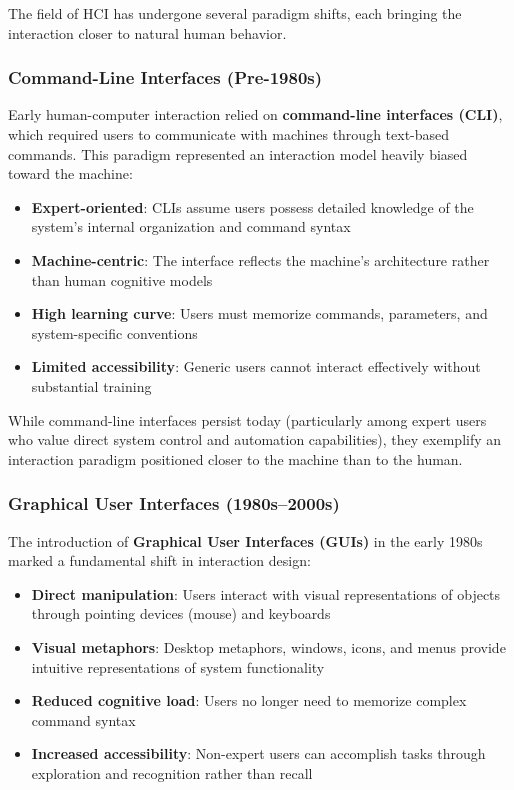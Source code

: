 \documentclass[11pt,a4paper]{article}
\theoremstyle{definition}
\theoremstyle{plain}
\theoremstyle{remark}
\begin{document}
The field of HCI has undergone several paradigm shifts, each bringing the interaction closer to natural human behavior.

\subsubsection{Command-Line Interfaces (Pre-1980s)}

Early human-computer interaction relied on \textbf{command-line interfaces (CLI)}, which required users to communicate with machines through text-based commands. This paradigm represented an interaction model heavily biased toward the machine:

\begin{itemize}
    \item \textbf{Expert-oriented}: CLIs assume users possess detailed knowledge of the system's internal organization and command syntax
    \item \textbf{Machine-centric}: The interface reflects the machine's architecture rather than human cognitive models
    \item \textbf{High learning curve}: Users must memorize commands, parameters, and system-specific conventions
    \item \textbf{Limited accessibility}: Generic users cannot interact effectively without substantial training
\end{itemize}

While command-line interfaces persist today (particularly among expert users who value direct system control and automation capabilities), they exemplify an interaction paradigm positioned closer to the machine than to the human.

\subsubsection{Graphical User Interfaces (1980s–2000s)}

The introduction of \textbf{Graphical User Interfaces (GUIs)} in the early 1980s marked a fundamental shift in interaction design:

\begin{itemize}
    \item \textbf{Direct manipulation}: Users interact with visual representations of objects through pointing devices (mouse) and keyboards
    \item \textbf{Visual metaphors}: Desktop metaphors, windows, icons, and menus provide intuitive representations of system functionality
    \item \textbf{Reduced cognitive load}: Users no longer need to memorize complex command syntax
    \item \textbf{Increased accessibility}: Non-expert users can accomplish tasks through exploration and recognition rather than recall
\end{itemize}
\end{document}
